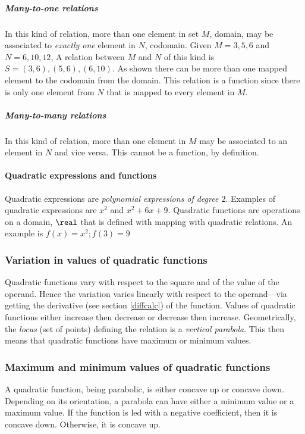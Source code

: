 \subparagraph{Many-to-one relations}
In this kind of relation, more than one element in set $M$, domain, may be associated to \emph{exactly one} element in $N$, codomain.
Given $M = {3, 5, 6}$ and $N = {6, 10, 12}$,
A relation between $M$ and $N$ of this kind is $S = {(3, 6), (5, 6), (6, 10)}$.
As shown there can be more than one mapped element to the codomain from the domain.
This relation is a function since there is only one element from $N$ that is mapped to every element in $M$.

\subparagraph{Many-to-many relations}
In this kind of relation, more than one element in $M$ may be associated to an element in $N$ and vice versa.
This cannot be a function, by definition.

\paragraph{Quadratic expressions and functions}
Quadratic expressions are \emph{polynomial expressions of degree $2$}.
Examples of quadratic expressions are $x^2$ and $x^2+6x+9$.
Quadratic functions are operations on a domain, $\real$ that is defined with mapping with quadratic relations.
An example is $f(x) = x^2; f(3) = 9$

\subsubsection{Variation in values of quadratic functions}
Quadratic functions vary with respect to the square and of the value of the operand.
Hence the variation varies linearly with respect to the operand---via getting the derivative (see section \ref{diffcalc}) of the function.
Values of quadratic functions either increase then decrease or decrease then increase.
Geometrically, the \emph{locus} (set of points) defining the relation is a \emph{vertical parabola}.
This then means that quadratic functions have maximum or minimum values.

\subsubsection{Maximum and minimum values of quadratic functions}
A quadratic function, being parabolic, is either concave up or concave down.
Depending on its orientation, a parabola can have either a minimum value or a maximum value.
If the function is led with a negative coefficient, then it is concave down.
Otherwise, it is concave up.

